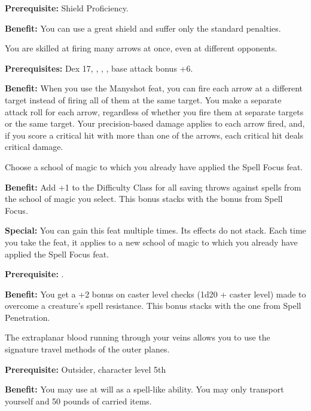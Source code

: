 
\textbf{Prerequisite:} Shield Proficiency.

\textbf{Benefit:} You can use a great shield and suffer only the standard penalties.


You are skilled at firing many arrows at once, even at different opponents.

\textbf{Prerequisites:} Dex 17, , , , base attack bonus +6.

\textbf{Benefit:} When you use the Manyshot feat, you can fire each arrow at a different target instead of firing all of them at the same target. You make a separate attack roll for each arrow, regardless of whether you fire them at separate targets or the same target. Your precision-based damage applies to each arrow fired, and, if you score a critical hit with more than one of the arrows, each critical hit deals critical damage.


Choose a school of magic to which you already have applied the Spell Focus feat.

\textbf{Benefit:} Add +1 to the Difficulty Class for all saving throws against spells from the school of magic you select. This bonus stacks with the bonus from Spell Focus.

\textbf{Special:} You can gain this feat multiple times. Its effects do not stack. Each time you take the feat, it applies to a new school of magic to which you already have applied the Spell Focus feat.


\textbf{Prerequisite:} .

\textbf{Benefit:} You get a +2 bonus on caster level checks (1d20 + caster level) made to overcome a creature's spell resistance. This bonus stacks with the one from Spell Penetration.


The extraplanar blood running through your veins allows you to use the signature travel methods of the outer planes.

\textbf{Prerequisite:} Outsider, character level 5th

\textbf{Benefit:} You may use  at will as a spell-like ability. You may only transport yourself and 50 pounds of carried items.

